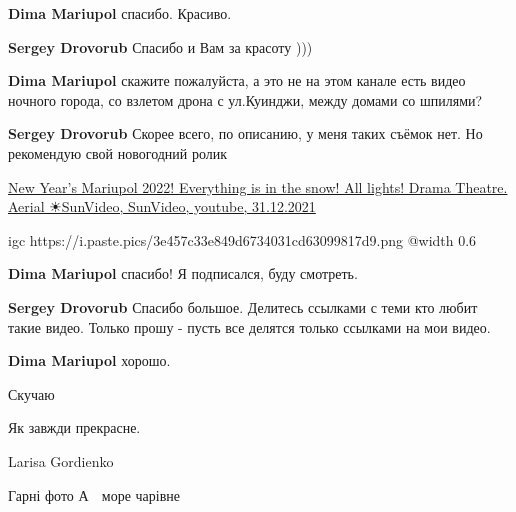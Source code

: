 \begin{itemize} %
\textbf{Dima Mariupol} спасибо. Красиво.

\begin{itemize} %
\textbf{Sergey Drovorub} Спасибо и Вам за красоту )))

\textbf{Dima Mariupol} скажите пожалуйста, а это не на этом канале есть видео ночного города, со взлетом дрона с ул.Куинджи, между домами со шпилями?

\textbf{Sergey Drovorub} Скорее всего, по описанию, у меня таких съёмок нет. Но рекомендую свой новогодний ролик 

\href{https://youtu.be/Dz_ACaSlsqE}{%
New Year's Mariupol 2022! Everything is in the snow! All lights! Drama Theatre. Aerial ☀SunVideo, %
SunVideo, youtube, 31.12.2021%
}

\ifcmt
  igc https://i.paste.pics/3e457c33e849d6734031cd63099817d9.png
	@width 0.6
\fi

\textbf{Dima Mariupol} спасибо! Я подписался, буду смотреть.

\textbf{Sergey Drovorub} Спасибо большое. Делитесь ссылками с теми кто любит такие видео. Только прошу - пусть все делятся только ссылками на мои видео.

\textbf{Dima Mariupol} хорошо.

\end{itemize} %

\end{itemize} %


Скучаю


Як завжди прекрасне.

Larisa Gordienko

Гарні фото
А 🌊 море чарівне
